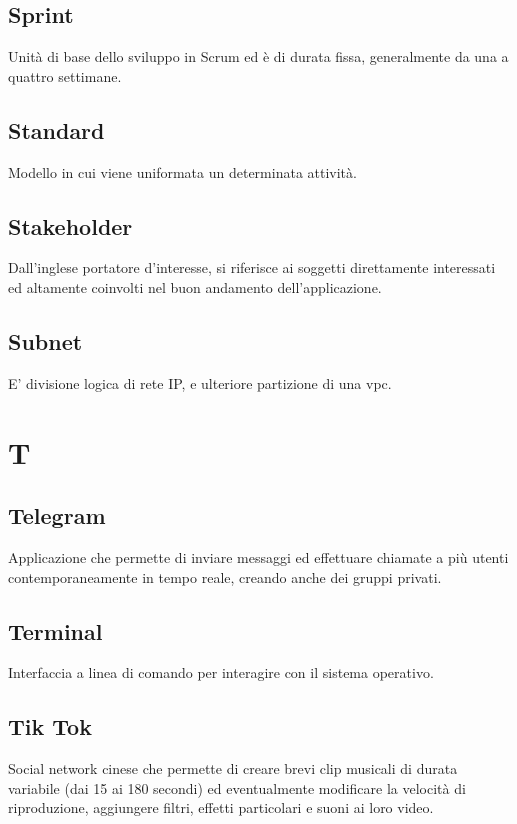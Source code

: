 \documentclass{classes/base}
\begin{document}
        \subsection*{Sprint}
        Unità di base dello sviluppo in Scrum ed è di durata fissa, generalmente da una a quattro settimane.

        \subsection*{Standard}
        Modello in cui viene uniformata un determinata attività.

        \subsection*{Stakeholder} 
        Dall'inglese portatore d'interesse, si riferisce ai soggetti direttamente interessati ed altamente coinvolti nel buon andamento dell'applicazione.

        \subsection*{Subnet}
        E' divisione logica di rete IP, e ulteriore partizione di una vpc.
        \newpage  
    \section{T}
        \subsection*{Telegram}
        Applicazione che permette di inviare messaggi ed effettuare chiamate a più utenti contemporaneamente in tempo reale, creando anche dei gruppi privati.

        \subsection*{Terminal} 
        Interfaccia a linea di comando per interagire con il sistema operativo.
        
        \subsection*{Tik Tok}
        Social network cinese che permette di creare brevi clip musicali di durata variabile (dai 15 ai 180 secondi) ed eventualmente modificare la velocità di riproduzione, aggiungere filtri, effetti particolari e suoni ai loro video.
        
\end{document}
